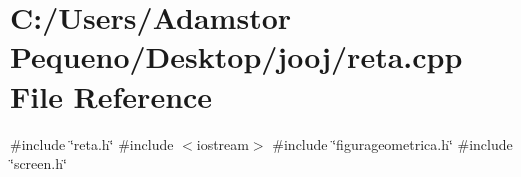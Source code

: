 \section{C\+:/\+Users/\+Adamstor Pequeno/\+Desktop/jooj/reta.cpp File Reference}
\label{reta_8cpp}
{\ttfamily \#include \char`\"{}reta.\+h\char`\"{}}\newline
{\ttfamily \#include $<$iostream$>$}\newline
{\ttfamily \#include \char`\"{}figurageometrica.\+h\char`\"{}}\newline
{\ttfamily \#include \char`\"{}screen.\+h\char`\"{}}\newline
